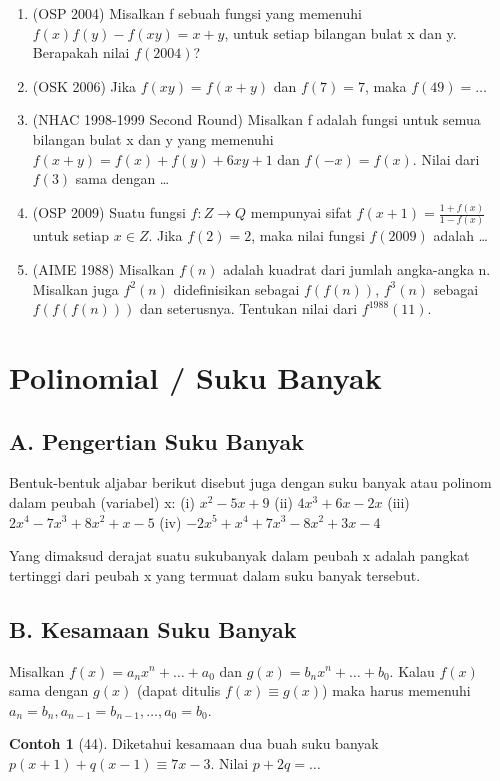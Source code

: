 \documentclass[12pt]{scrartcl}
\theoremstyle{definition}
\newtheorem{contoh}{Contoh}
\begin{document}
\begin{enumerate}
    \item (OSP 2004) Misalkan f sebuah fungsi yang memenuhi $f(x)f(y) - f(xy) = x+y$, untuk setiap bilangan bulat x dan y. Berapakah nilai $f(2004)$?
    
    \item (OSK 2006) Jika $f(xy) = f(x+y)$ dan $f(7)=7$, maka $f(49) = \dots$
    
    \item (NHAC 1998-1999 Second Round) Misalkan f adalah fungsi untuk semua bilangan bulat x dan y yang memenuhi $f(x+y) = f(x)+f(y)+6xy+1$ dan $f(-x)=f(x)$. Nilai dari $f(3)$ sama dengan \dots
    
    \item (OSP 2009) Suatu fungsi $f : Z \to Q$ mempunyai sifat $f(x+1) = \frac{1+f(x)}{1-f(x)}$ untuk setiap $x \in Z$. Jika $f(2) = 2$, maka nilai fungsi $f(2009)$ adalah \dots
    
    \item (AIME 1988) Misalkan $f(n)$ adalah kuadrat dari jumlah angka-angka n. Misalkan juga $f^2(n)$ didefinisikan sebagai $f(f(n))$, $f^3(n)$ sebagai $f(f(f(n)))$ dan seterusnya. Tentukan nilai dari $f^{1988}(11)$.
\end{enumerate}

\section*{Polinomial / Suku Banyak}
\subsection*{A. Pengertian Suku Banyak}
Bentuk-bentuk aljabar berikut disebut juga dengan suku banyak atau polinom dalam peubah (variabel) x:
(i) $x^2 - 5x + 9$
(ii) $4x^3 + 6x - 2x$
(iii) $2x^4 - 7x^3 + 8x^2 + x - 5$
(iv) $-2x^5 + x^4 + 7x^3 - 8x^2 + 3x - 4$

Yang dimaksud derajat suatu sukubanyak dalam peubah x adalah pangkat tertinggi dari peubah x yang termuat dalam suku banyak tersebut. 

\subsection*{B. Kesamaan Suku Banyak}
Misalkan $f(x) = a_n x^n + \dots + a_0$ dan $g(x) = b_n x^n + \dots + b_0$.
Kalau $f(x)$ sama dengan $g(x)$ (dapat ditulis $f(x) \equiv g(x)$) maka harus memenuhi $a_n = b_n, a_{n-1} = b_{n-1}, \dots, a_0 = b_0$. 

\begin{contoh}[44]
Diketahui kesamaan dua buah suku banyak $p(x+1) + q(x-1) \equiv 7x-3$. Nilai $p+2q = \dots$
\end{contoh}
\end{document}
